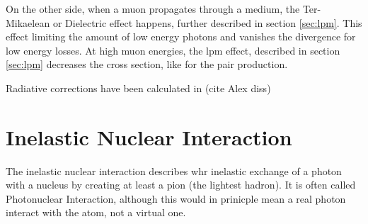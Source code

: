 On the other side, when a muon propagates through a medium, the Ter-Mikaelean or Dielectric effect happens, further described in section \ref{sec:lpm}.
This effect limiting the amount of low energy photons and vanishes the divergence for low energy losses.
At high muon energies, the lpm effect, described in section \ref{sec:lpm} decreases the cross section, like for the pair production.

Radiative corrections have been calculated in (cite Alex diss)

\section{Inelastic Nuclear Interaction}

The inelastic nuclear interaction describes whr inelastic exchange of a photon with a nucleus by creating at least a pion (the lightest hadron).
It is often called Photonuclear Interaction, although this would in prinicple mean a real photon interact with the atom, not a virtual one.









